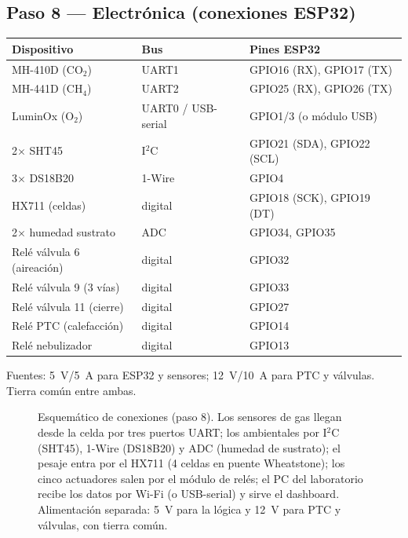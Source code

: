 \documentclass[11pt,a4paper]{article}
\newcommand{\paso}[1]{\subsection*{\large Paso #1}}
\begin{document}
\paso{8 --- Electrónica (conexiones ESP32)}
\begin{center}
\small
\begin{tabular}{@{}lll@{}}
\toprule
\textbf{Dispositivo} & \textbf{Bus} & \textbf{Pines ESP32} \\
\midrule
MH-410D (CO$_2$) & UART1 & GPIO16 (RX), GPIO17 (TX) \\
MH-441D (CH$_4$) & UART2 & GPIO25 (RX), GPIO26 (TX) \\
LuminOx (O$_2$) & UART0 / USB-serial & GPIO1/3 (o módulo USB) \\
2$\times$ SHT45 & I$^2$C & GPIO21 (SDA), GPIO22 (SCL) \\
3$\times$ DS18B20 & 1-Wire & GPIO4 \\
HX711 (celdas) & digital & GPIO18 (SCK), GPIO19 (DT) \\
2$\times$ humedad sustrato & ADC & GPIO34, GPIO35 \\
Relé válvula 6 (aireación) & digital & GPIO32 \\
Relé válvula 9 (3 vías) & digital & GPIO33 \\
Relé válvula 11 (cierre) & digital & GPIO27 \\
Relé PTC (calefacción) & digital & GPIO14 \\
Relé nebulizador & digital & GPIO13 \\
\bottomrule
\end{tabular}
\end{center}

\noindent Fuentes: 5~V/5~A para ESP32 y sensores; 12~V/10~A para PTC y
válvulas. Tierra común entre ambas.

\begin{figure}[h!]
\centering
\resizebox{0.98\textwidth}{!}{}
\caption{Esquemático de conexiones (paso 8). Los sensores de gas llegan desde la celda por tres puertos UART; los ambientales por I$^2$C (SHT45), 1-Wire (DS18B20) y ADC (humedad de sustrato); el pesaje entra por el HX711 (4 celdas en puente Wheatstone); los cinco actuadores salen por el módulo de relés; el PC del laboratorio recibe los datos por Wi-Fi (o USB-serial) y sirve el dashboard. Alimentación separada: 5~V para la lógica y 12~V para PTC y válvulas, con tierra común.}
\label{fig:electronica}
\end{figure}
\end{document}
